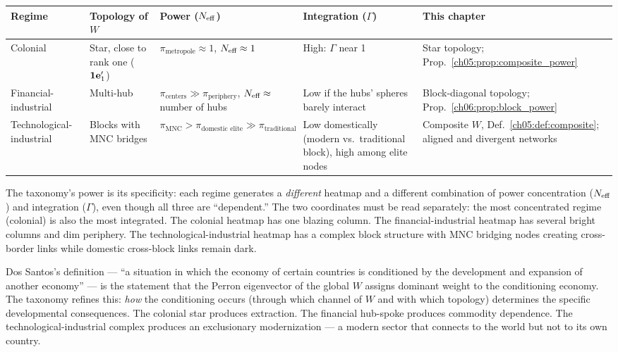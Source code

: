 \documentclass[../structural_economics_book.tex]{subfiles}
\begin{document}
\begin{center}
{\small
\begin{tabularx}{\textwidth}{LLLLL}
\toprule
\textbf{Regime} & \textbf{Topology of $W$} & \textbf{Power ($N_{\text{eff}}$)} & \textbf{Integration ($\Gamma$)} & \textbf{This chapter} \\
\midrule
Colonial & Star, close to rank one ($\mathbf{1}\mathbf{e}_1'$) & $\pi_{\text{metropole}} \approx 1$, $N_{\text{eff}} \approx 1$ & High: $\Gamma$ near 1 & Star topology; Prop.~\ref{ch05:prop:composite_power} \\
Financial-industrial & Multi-hub & $\pi_{\text{centers}} \gg \pi_{\text{periphery}}$, $N_{\text{eff}} \approx$ number of hubs & Low if the hubs' spheres barely interact & Block-diagonal topology; Prop.~\ref{ch06:prop:block_power} \\
Technological-industrial & Blocks with MNC bridges & $\pi_{\text{MNC}} > \pi_{\text{domestic elite}} \gg \pi_{\text{traditional}}$ & Low domestically (modern vs.\ traditional block), high among elite nodes & Composite $W$, Def.~\ref{ch05:def:composite}; aligned and divergent networks \\
\bottomrule
\end{tabularx}
}
\end{center}

The taxonomy's power is its specificity: each regime generates a \textit{different} heatmap and a different combination of power concentration ($N_{\text{eff}}$) and integration ($\Gamma$), even though all three are ``dependent.'' The two coordinates must be read separately: the most concentrated regime (colonial) is also the most integrated. The colonial heatmap has one blazing column. The financial-industrial heatmap has several bright columns and dim periphery. The technological-industrial heatmap has a complex block structure with MNC bridging nodes creating cross-border links while domestic cross-block links remain dark.

Dos Santos's definition --- ``a situation in which the economy of certain countries is conditioned by the development and expansion of another economy'' --- is the statement that the Perron eigenvector of the global $W$ assigns dominant weight to the conditioning economy. The taxonomy refines this: \textit{how} the conditioning occurs (through which channel of $W$ and with which topology) determines the specific developmental consequences. The colonial star produces extraction. The financial hub-spoke produces commodity dependence. The technological-industrial complex produces an exclusionary modernization --- a modern sector that connects to the world but not to its own country.
\end{document}
